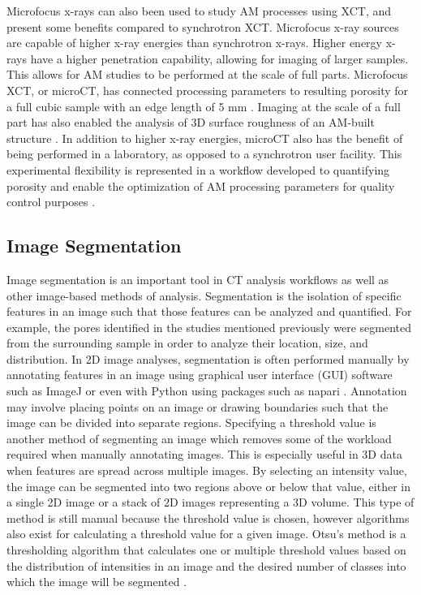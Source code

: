 Microfocus x-rays can also been used to study AM processes using XCT, and
present some benefits compared to synchrotron XCT. Microfocus x-ray
sources are capable of higher x-ray energies than synchrotron x-rays.
Higher energy x-rays have a higher penetration capability, allowing for
imaging of larger samples. This allows for AM studies to be performed at
the scale of full parts. Microfocus XCT, or microCT, has connected
processing parameters to resulting porosity for a full cubic sample with
an edge length of 5 mm \cite{Duplessis2019}. Imaging at the scale of a
full part has also enabled the analysis of 3D surface roughness of an
AM-built structure \cite{Kerckhofs2013}. In addition to higher x-ray
energies, microCT also has the benefit of being performed in a laboratory,
as opposed to a synchrotron user facility. This experimental flexibility
is represented in a workflow developed to quantifying porosity and enable
the optimization of AM processing parameters for quality control purposes
\cite{Duplessis2018}.

\subsection{Image Segmentation}
Image segmentation is an important tool in CT analysis workflows as well
as other image-based methods of analysis. Segmentation is the isolation of
specific features in an image such that those features can be analyzed and
quantified. For example, the pores identified in the studies mentioned
previously \cite{Duplessis2019, Duplessis2018} were segmented from the
surrounding sample in order to analyze their location, size, and
distribution. In 2D image analyses, segmentation is often performed
manually by annotating features in an image using graphical user interface
(GUI) software such as ImageJ \cite{imagej} or even with Python using
packages such as napari \cite{napari}. Annotation may involve placing
points on an image or drawing boundaries such that the image can be
divided into separate regions. Specifying a threshold value is another
method of segmenting an image which removes some of the workload required
when manually annotating images. This is especially useful in 3D data when
features are spread across multiple images. By selecting an intensity
value, the image can be segmented into two regions above or below that
value, either in a single 2D image or a stack of 2D images representing a
3D volume. This type of method is still manual because the threshold value
is chosen, however algorithms also exist for calculating a threshold value
for a given image. Otsu's method is a thresholding algorithm that
calculates one or multiple threshold values based on the distribution of
intensities in an image and the desired number of classes into which the
image will be segmented \cite{Otsu1979}.


